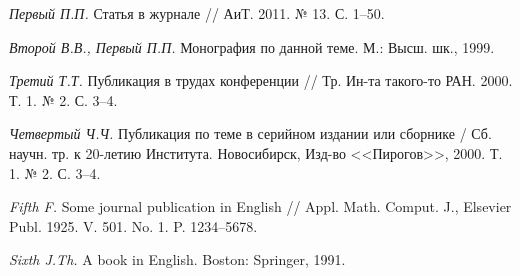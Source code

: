 \documentclass[12pt]{a&t}
\begin{document}

\begin{thebibliography}{10}

{\it Первый П.П.}
Статья в журнале // АиТ. 2011. № 13. С. 1--50.

{\it Второй В.В., Первый П.П.}
Монография по данной теме. М.: Высш. шк., 1999.

{\it Третий Т.Т.}
Публикация в трудах конференции //
Тр. Ин-та такого-то РАН. 2000. Т. 1. № 2. С. 3--4.

{\it Четвертый Ч.Ч.}
Публикация по теме в серийном издании или сборнике /
Сб. научн. тр. к 20-летию Института. Новосибирск, Изд-во <<Пирогов>>, 2000. Т. 1. № 2. С. 3--4.

{\it Fifth F.}
Some journal publication in English //
Appl. Math. Comput. J., Elsevier Publ. 1925. V. 501. No. 1. P. 1234--5678.

{\it Sixth J.Th.}
A book in English. Boston: Springer, 1991.

\end{thebibliography}


\end{document}
